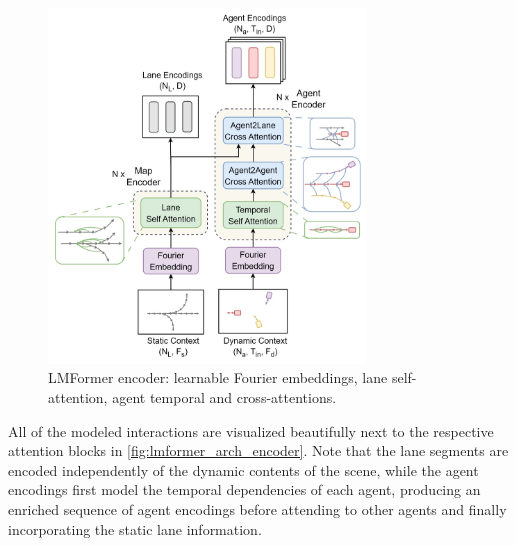 \begin{figure}[ht]
  \centering
  \includegraphics[width=0.75\textwidth]{figures/lmformer_arch_encorder.png}
  \caption{LMFormer encoder: learnable Fourier embeddings, lane self-attention, agent temporal and cross-attentions.}
  \label{fig:lmformer_arch_encoder}
\end{figure}

All of the modeled interactions are visualized beautifully next to the respective attention blocks in \autoref{fig:lmformer_arch_encoder}. Note that the lane segments are encoded independently of the dynamic contents of the scene, while the agent encodings first model the temporal dependencies of each agent, producing an enriched sequence of agent encodings before attending to other agents and finally incorporating the static lane information.


